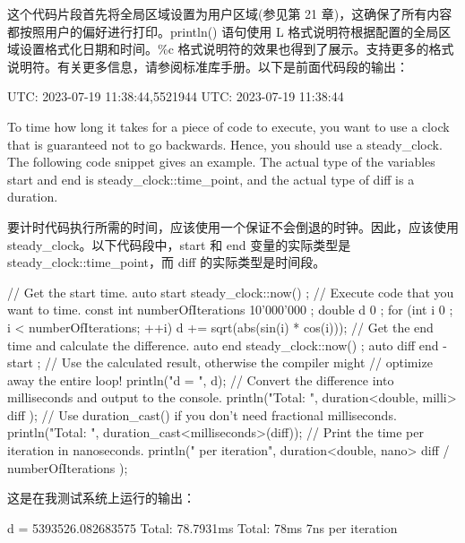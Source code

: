 这个代码片段首先将全局区域设置为用户区域(参见第 21 章)，这确保了所有内容都按照用户的偏好进行打印。println() 语句使用 L 格式说明符根据配置的全局区域设置格式化日期和时间。\%c 格式说明符的效果也得到了展示。支持更多的格式说明符。有关更多信息，请参阅标准库手册。以下是前面代码段的输出：

\begin{shell}
UTC: 2023-07-19 11:38:44,5521944
UTC: 2023-07-19 11:38:44
\end{shell}


To time how long it takes for a piece of code to execute, you want to use a clock that is guaranteed not to go backwards. Hence, you should use a steady\_clock. The following code snippet gives an example. The actual type of the variables start and end is steady\_clock::time\_point, and the actual type of diff is a duration.

要计时代码执行所需的时间，应该使用一个保证不会倒退的时钟。因此，应该使用 steady\_clock。以下代码段中，start 和 end 变量的实际类型是 steady\_clock::time\_point，而 diff 的实际类型是时间段。

\begin{cpp}
// Get the start time.
auto start { steady_clock::now() };
// Execute code that you want to time.
const int numberOfIterations { 10'000'000 };
double d { 0 };
for (int i { 0 }; i < numberOfIterations; ++i) { d += sqrt(abs(sin(i) * cos(i))); }
// Get the end time and calculate the difference.
auto end { steady_clock::now() };
auto diff { end - start };
// Use the calculated result, otherwise the compiler might
// optimize away the entire loop!
println("d = {}", d);
// Convert the difference into milliseconds and output to the console.
println("Total: {}", duration<double, milli> { diff });
// Use duration_cast() if you don't need fractional milliseconds.
println("Total: {}", duration_cast<milliseconds>(diff));
// Print the time per iteration in nanoseconds.
println("{} per iteration", duration<double, nano> { diff / numberOfIterations });
\end{cpp}

这是在我测试系统上运行的输出：

\begin{shell}
d = 5393526.082683575
Total: 78.7931ms
Total: 78ms
7ns per iteration
\end{shell}

